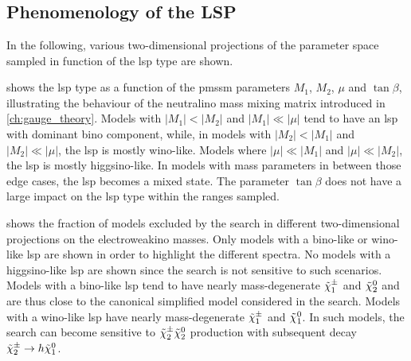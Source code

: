 
\chapter{}
\ifpdf
\graphicspath{{chapter-pmssm/Figs/Raster/}{chapter-pmssm/Figs/PDF/}{chapter-pmssm/Figs/}}
\else
\graphicspath{{chapter-pmssm/Figs/Vector/}{chapter-pmssm/Figs/}}
\fi

\section{Phenomenology of the LSP}

In the following, various two-dimensional projections of the parameter space sampled in function of the \gls{lsp} type are shown.

 shows the \gls{lsp} type as a function of the \gls{pmssm} parameters $M_1$, $M_2$, $\mu$ and $\tan\beta$, illustrating the behaviour of the neutralino mass mixing matrix introduced in \cref{ch:gauge_theory}. Models with $\vert M_1\vert < \vert M_2\vert$ and $\vert M_1\vert \ll \vert\mu\vert$ tend to have an \gls{lsp} with dominant bino component, while, in models with $\vert M_2 \vert < \vert M_1 \vert$ and $ \vert M_2 \vert  \ll \vert\mu\vert$, the \gls{lsp} is mostly wino-like. Models where  $\vert\mu\vert\ll \vert M_1 \vert$ and $\vert\mu\vert\ll \vert M_2 \vert$, the \gls{lsp} is mostly higgsino-like. In models with mass parameters in between those edge cases, the \gls{lsp} becomes a mixed state. The parameter $\tan\beta$ does not have a large impact on the \gls{lsp} type within the ranges sampled.

 shows the fraction of models excluded by the \onelepton search in different two-dimensional projections on the electroweakino masses. Only models with a bino-like or wino-like \gls{lsp} are shown in order to highlight the different spectra. No models with a higgsino-like \gls{lsp} are shown since the \onelepton search is not sensitive to such scenarios. Models with a bino-like \gls{lsp} tend to have nearly mass-degenerate $\tilde{\chi}_1^\pm$ and $\tilde{\chi}_2^0$ and are thus close to the canonical simplified model considered in the search. Models with a wino-like \gls{lsp} have nearly mass-degenerate $\tilde{\chi}_1^\pm$ and $\tilde{\chi}_1^0$. In such models, the \onelepton search can become sensitive to $\tilde{\chi}_2^\pm\tilde{\chi}_2^0$ production with subsequent decay $\tilde{\chi}_2^\pm \to h\tilde{\chi}_1^0$.

